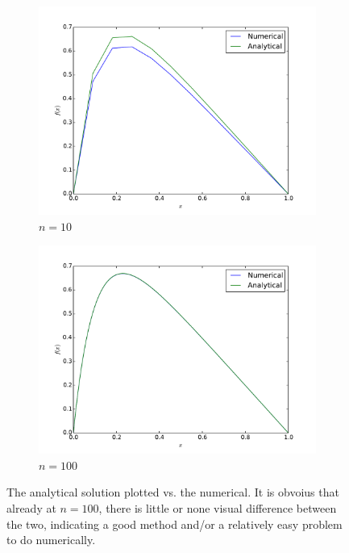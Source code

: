 \documentclass[11pt]{article}
\begin{document}
		\begin{figure}
 		   \centering
		    \begin{subfigure}[b]{0.4\textwidth}
        		\includegraphics[scale=0.4, clip=true, trim= 50 0 0 0]{FYS3150_project_1_figure_n_10}
  		      \caption{$n = 10$}
 		       \label{fig:gull}
		    \end{subfigure}
		    \qquad \qquad \quad %
		    \begin{subfigure}[b]{0.4\textwidth}
		        \includegraphics[scale=0.4, clip=true, trim= 50 0 0 0]{FYS3150_project_1_figure_n_100}
		        \caption{$n = 100$}
		        \label{fig:tiger}
		    \end{subfigure}
		    \caption{The analytical solution plotted vs. the numerical. It is obvoius that already at $n=100$, there is little or none visual difference between the two, indicating a good method and/or a relatively easy problem to do numerically.}\label{fig:animals}
		\end{figure}
		
\end{document}
